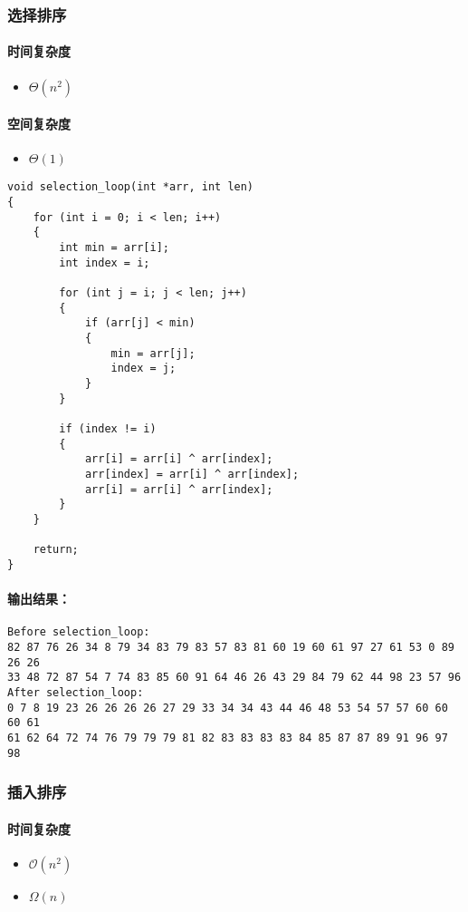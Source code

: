 \documentclass[UTF8]{ctexart}
\begin{document}
\subsubsection{选择排序}
\paragraph{时间复杂度}
\begin{itemize}
    \item $\Theta(n^2)$
\end{itemize}
\paragraph{空间复杂度}
\begin{itemize}
	\item $\Theta(1)$
\end{itemize}
\begin{lstlisting}
void selection_loop(int *arr, int len)
{
	for (int i = 0; i < len; i++)
	{
		int min = arr[i];
		int index = i;

		for (int j = i; j < len; j++)
		{
			if (arr[j] < min)
			{
				min = arr[j];
				index = j;
			}
		}

		if (index != i)
		{
			arr[i] = arr[i] ^ arr[index];
			arr[index] = arr[i] ^ arr[index];
			arr[i] = arr[i] ^ arr[index];
		}
	}

	return;
}
\end{lstlisting}
\paragraph{输出结果：}
\begin{lstlisting}
Before selection_loop:
82 87 76 26 34 8 79 34 83 79 83 57 83 81 60 19 60 61 97 27 61 53 0 89 26 26 
33 48 72 87 54 7 74 83 85 60 91 64 46 26 43 29 84 79 62 44 98 23 57 96 
After selection_loop:
0 7 8 19 23 26 26 26 26 27 29 33 34 34 43 44 46 48 53 54 57 57 60 60 60 61 
61 62 64 72 74 76 79 79 79 81 82 83 83 83 83 84 85 87 87 89 91 96 97 98
\end{lstlisting}
\subsubsection{插入排序}
\paragraph{时间复杂度}
\begin{itemize}
	\item $\mathcal{O}(n^2)$
	\item $\Omega(n)$
\end{itemize}
\end{document}
